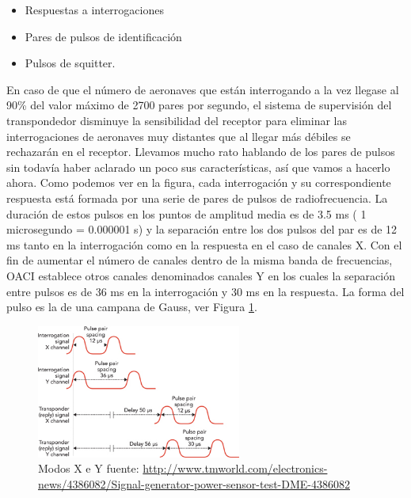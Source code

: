 \begin{itemize}
	\item Respuestas a interrogaciones
	\item Pares de pulsos de identificaci\'on
	\item Pulsos de squitter.
\end{itemize}


En caso de que el n\'umero de aeronaves que est\'an interrogando a la vez llegase al 90\% del valor m\'aximo de 2700 pares por segundo, el sistema de supervisi\'on del transpondedor disminuye la sensibilidad del receptor para eliminar las interrogaciones de aeronaves muy distantes que al llegar m\'as d\'ebiles se rechazar\'an en el receptor. Llevamos mucho rato hablando de los pares de pulsos sin todav\'ia haber aclarado un poco sus caracter\'isticas, as\'i que vamos a hacerlo ahora. Como podemos ver en la figura, cada interrogaci\'on y su correspondiente respuesta est\'a formada por una serie de pares de pulsos de radiofrecuencia. La duraci\'on de estos pulsos en los puntos de amplitud media es de 3.5 ms ( 1 microsegundo = 0.000001 s) y la separaci\'on entre los dos pulsos del par es de 12 ms tanto en la interrogaci\'on como en la respuesta en el caso de canales X. Con el fin de aumentar el n\'umero de canales dentro de la misma banda de frecuencias, OACI establece otros canales denominados canales Y en los cuales la separaci\'on entre pulsos es de 36 ms en la interrogaci\'on y 30 ms en la respuesta. La forma del pulso es la de una campana de Gauss, ver Figura \ref{fig:DME.modos.X.e.Y.grafico}.

\begin{figure}[!htb]
  \centering
  \includegraphics[width=0.6\textwidth]{Imagenes/06.04.dme.imagenes/dme-modos-x-y-graficos.jpg}
  \caption{Modos X e Y
{\tiny fuente: \url{http://www.tmworld.com/electronics-news/4386082/Signal-generator-power-sensor-test-DME-4386082
}}
}
  \label{fig:DME.modos.X.e.Y.grafico}
\end{figure}


